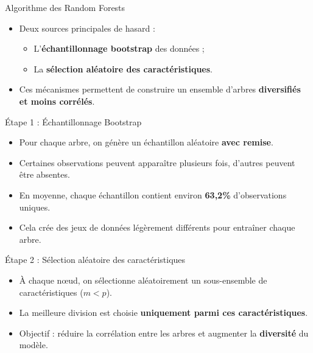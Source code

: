 \documentclass[11pt]{beamer}
\begin{document}
\begin{frame}{Algorithme des Random Forests}
\begin{itemize}
    \item Deux sources principales de hasard :
    \begin{itemize}
        \item L'\textbf{échantillonnage bootstrap} des données ;
        \item La \textbf{sélection aléatoire des caractéristiques}.
    \end{itemize}
    \item Ces mécanismes permettent de construire un ensemble d'arbres \textbf{diversifiés et moins corrélés}.
\end{itemize}
\end{frame}

\begin{frame}{Étape 1 : Échantillonnage Bootstrap}
\begin{itemize}
    \item Pour chaque arbre, on génère un échantillon aléatoire \textbf{avec remise}.
    \item Certaines observations peuvent apparaître plusieurs fois, d'autres peuvent être absentes.
    \item En moyenne, chaque échantillon contient environ \textbf{63,2\%} d'observations uniques.
    \item Cela crée des jeux de données légèrement différents pour entraîner chaque arbre.
\end{itemize}
\end{frame}

\begin{frame}{Étape 2 : Sélection aléatoire des caractéristiques}
\begin{itemize}
    \item À chaque nœud, on sélectionne aléatoirement un sous-ensemble de caractéristiques ($m < p$).
    \item La meilleure division est choisie \textbf{uniquement parmi ces caractéristiques}.
    \item Objectif : réduire la corrélation entre les arbres et augmenter la \textbf{diversité} du modèle.
\end{itemize}
\end{frame}
\end{document}
